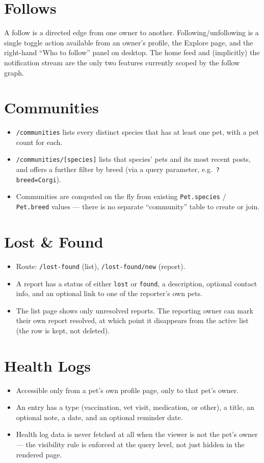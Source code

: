 \documentclass[11pt,a4paper]{article}
\begin{document}
\section{Follows}
A follow is a directed edge from one owner to another. Following/unfollowing is a
single toggle action available from an owner's profile, the Explore page, and the
right-hand ``Who to follow'' panel on desktop. The home feed and (implicitly) the
notification stream are the only two features currently scoped by the follow graph.

\section{Communities}
\begin{itemize}[leftmargin=*]
  \item \texttt{/communities} lists every distinct species that has at least one pet,
        with a pet count for each.
  \item \texttt{/communities/[species]} lists that species' pets and its most recent
        posts, and offers a further filter by breed (via a query parameter, e.g.\
        \texttt{?breed=Corgi}).
  \item Communities are computed on the fly from existing \texttt{Pet.species} /
        \texttt{Pet.breed} values --- there is no separate ``community'' table to
        create or join.
\end{itemize}

\section{Lost \& Found}
\begin{itemize}[leftmargin=*]
  \item Route: \texttt{/lost-found} (list), \texttt{/lost-found/new} (report).
  \item A report has a status of either \texttt{lost} or \texttt{found}, a description,
        optional contact info, and an optional link to one of the reporter's own pets.
  \item The list page shows only unresolved reports. The reporting owner can mark their
        own report resolved, at which point it disappears from the active list (the row
        is kept, not deleted).
\end{itemize}

\section{Health Logs}
\begin{itemize}[leftmargin=*]
  \item Accessible only from a pet's own profile page, only to that pet's owner.
  \item An entry has a type (vaccination, vet visit, medication, or other), a title, an
        optional note, a date, and an optional reminder date.
  \item Health log data is never fetched at all when the viewer is not the pet's owner
        --- the visibility rule is enforced at the query level, not just hidden in the
        rendered page.
\end{itemize}
\end{document}
